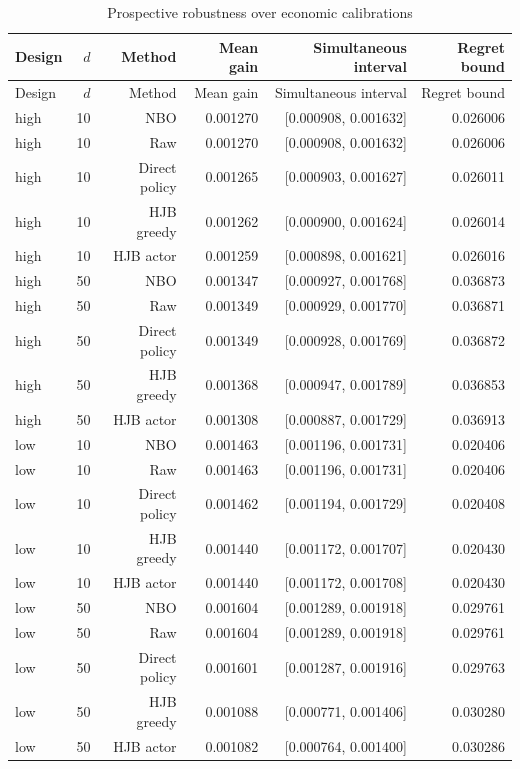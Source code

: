 \begingroup\small
\begin{longtable}{lrrrrr}
\caption{Prospective robustness over economic calibrations}\label{tab:r16-robustness-methods}\\
\toprule
Design & $d$ & Method & Mean gain & Simultaneous interval & Regret bound \\
\midrule
\endfirsthead
\toprule
Design & $d$ & Method & Mean gain & Simultaneous interval & Regret bound \\
\midrule
\endhead
high & 10 & NBO & 0.001270 & [0.000908, 0.001632] & 0.026006 \\
high & 10 & Raw & 0.001270 & [0.000908, 0.001632] & 0.026006 \\
high & 10 & Direct policy & 0.001265 & [0.000903, 0.001627] & 0.026011 \\
high & 10 & HJB greedy & 0.001262 & [0.000900, 0.001624] & 0.026014 \\
high & 10 & HJB actor & 0.001259 & [0.000898, 0.001621] & 0.026016 \\
high & 50 & NBO & 0.001347 & [0.000927, 0.001768] & 0.036873 \\
high & 50 & Raw & 0.001349 & [0.000929, 0.001770] & 0.036871 \\
high & 50 & Direct policy & 0.001349 & [0.000928, 0.001769] & 0.036872 \\
high & 50 & HJB greedy & 0.001368 & [0.000947, 0.001789] & 0.036853 \\
high & 50 & HJB actor & 0.001308 & [0.000887, 0.001729] & 0.036913 \\
low & 10 & NBO & 0.001463 & [0.001196, 0.001731] & 0.020406 \\
low & 10 & Raw & 0.001463 & [0.001196, 0.001731] & 0.020406 \\
low & 10 & Direct policy & 0.001462 & [0.001194, 0.001729] & 0.020408 \\
low & 10 & HJB greedy & 0.001440 & [0.001172, 0.001707] & 0.020430 \\
low & 10 & HJB actor & 0.001440 & [0.001172, 0.001708] & 0.020430 \\
low & 50 & NBO & 0.001604 & [0.001289, 0.001918] & 0.029761 \\
low & 50 & Raw & 0.001604 & [0.001289, 0.001918] & 0.029761 \\
low & 50 & Direct policy & 0.001601 & [0.001287, 0.001916] & 0.029763 \\
low & 50 & HJB greedy & 0.001088 & [0.000771, 0.001406] & 0.030280 \\
low & 50 & HJB actor & 0.001082 & [0.000764, 0.001400] & 0.030286 \\

\end{longtable}
